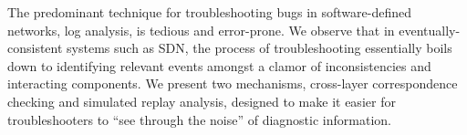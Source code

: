 The predominant technique for troubleshooting bugs in software-defined networks, log
analysis, is tedious and error-prone. We observe that
in eventually-consistent systems such as SDN, the process of troubleshooting
essentially boils down to identifying relevant events
amongst a clamor of inconsistencies and interacting components. We present two
mechanisms, cross-layer correspondence checking and simulated replay analysis, 
designed to make it easier for troubleshooters to ``see through the noise'' of
diagnostic information.
